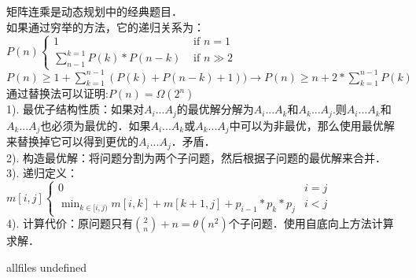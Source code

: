 \documentclass[a4paper,10pt]{article}
\begin{document}
\begin{CJK}{UTF8}{gbsn}     %

\else

矩阵连乘是动态规划中的经典题目．\\

如果通过穷举的方法，它的递归关系为：\\

$P(n)\begin{cases}
	1 & \text{ if } n= 1 \\ 
	\sum_{n-1}^{k=1}P(k)*P(n-k) & \text{ if } n\gg 2  
\end{cases}$\\

$P(n)\geq 1+\sum_{k=1}^{n-1}(P(k)+P(n-k)+1)) \rightarrow P(n)\geq n+2\ast \sum_{k=1}^{n-1}P(k)$\\

通过替换法可以证明:$P(n)=\Omega (2^{n})$\\

1).	最优子结构性质：如果对$A_{i}...A_{j}$的最优解分解为$A_{i}...A_{k}$和$A_{k}...A_{j}$.则$A_{i}...A_{k}$和$A_{k}...A_{j}$也必须为最优的．如果$A_{i}...A_{k}$或$A_{k}...A_{j}$中可以为非最优，那么使用最优解来替换掉它可以得到更优的$A_{i}...A_{j}$．矛盾．\\

2).	构造最优解：将问题分割为两个子问题，然后根据子问题的最优解来合并．\\

3).	递归定义：$m[i,j]\left\{\begin{matrix}
		0 & i= j\\ 
		\min_{k \in [i,j)} {m[i,k]+m[k+1,j]+p_{i-1}\ast p_{k}\ast p_{j}} & i< j
	\end{matrix}\right.$\\

4).	计算代价：原问题只有$\binom{2}{n}+n=\theta (n^{2})$个子问题．使用自底向上方法计算求解．\\
\fi

\ifx allfiles undefined
\end{CJK}
\end{document}
